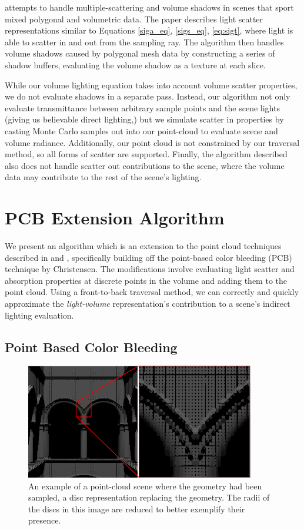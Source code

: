 \documentclass[12pt]{ucthesis}
\begin{document}
\cite{zhang} attempts to handle multiple-scattering and volume shadows in scenes that sport mixed polygonal and volumetric data.  The paper describes light scatter representations similar to Equations \ref{siga_eq}, \ref{sigs_eq}, \ref{eq:sigt}, where light is able to scatter in and out from the sampling ray.  The algorithm then handles volume shadows caused by polygonal mesh data by constructing a series of shadow buffers, evaluating the volume shadow as a texture at each slice.

While our volume lighting equation takes into account volume scatter properties, we do not evaluate shadows in a separate pass.  Instead, our algorithm not only evaluate transmittance between arbitrary sample points and the scene lights (giving us believable direct lighting,) but we simulate scatter in properties by casting Monte Carlo samples out into our point-cloud to evaluate scene and volume radiance.  Additionally, our point cloud is not constrained by our traversal method, so all forms of scatter are supported.  Finally, the algorithm described also does not handle scatter out contributions to the scene, where the volume data may contribute to the rest of the scene's lighting.

\chapter{PCB Extension Algorithm}
\label{algorithm_sec}
We present an algorithm which is an extension to the point cloud techniques described in \cite{tabellion} and \cite{christensen:2008}, specifically building off the point-based color bleeding (PCB) technique by Christensen.  The modifications involve evaluating light scatter and absorption properties at discrete points in the volume and adding them to the point cloud.  Using a front-to-back traversal method, we can correctly and quickly approximate the \textit{light-volume} representation's contribution to a scene's indirect lighting evaluation.

\section{Point Based Color Bleeding}

\begin{figure}[h!]
    \centering
    \includegraphics[width=100mm]{img/pcloud.png}
    \caption{An example of a point-cloud scene where the geometry had been sampled, a disc representation replacing the geometry.  The radii of the discs in this image are reduced to better exemplify their presence.}
    \label{fig:pcloud}
\end{figure}
\end{document}
